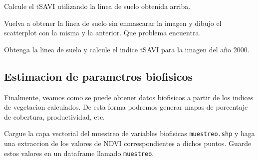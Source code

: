 \begin{act}
    Calcule el tSAVI utilizando la linea de suelo obtenida arriba.
\end{act}

\begin{act}
    Vuelva a obtener la linea de suelo sin enmascarar la imagen y dibujo el
    scatterplot con la misma y la anterior. Que problema encuentra.
\end{act}

\begin{act}
    Obtenga la linea de suelo y calcule el indice tSAVI para la imagen del año
    2000.
\end{act}

\subsection{Estimacion de parametros biofisicos}

Finalmente, veamos como se puede obtener datos biofisicos a partir de los
indices de vegetacion calculados. De esta forma podremos generar mapas de
porcentaje de cobertura, productividad, etc.

\begin{act}
    Cargue la capa vectorial del muestreo de variables biofisicas
    \texttt{muestreo.shp} y haga una extraccion de los valores de NDVI
    correspondientes a dichos puntos. Guarde estos valores en un dataframe
    llamado \texttt{muestreo}.
\end{act}

